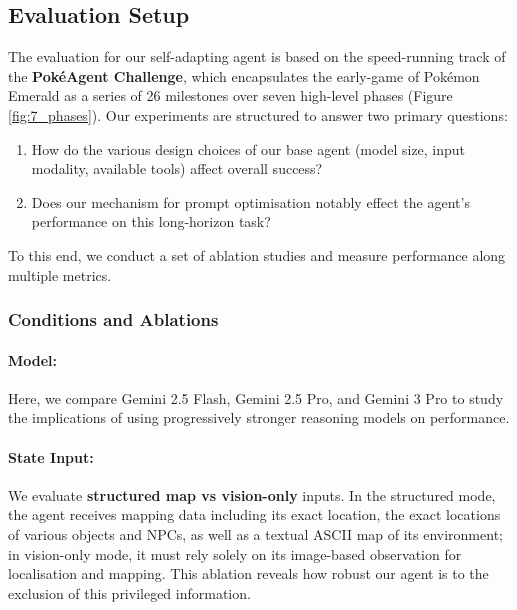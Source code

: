 \documentclass[11pt]{article}
\begin{document}
\subsection{Evaluation Setup}
The evaluation for our self-adapting agent is based on the speed-running track of the \textbf{PokéAgent Challenge}, which encapsulates the early-game of Pokémon Emerald as a series of 26 milestones over seven high-level phases (Figure \ref{fig:7_phases}). Our experiments are structured to answer two primary questions:
\begin{enumerate}
    \item How do the various design choices of our base agent (model size, input modality, available tools) affect overall success? 
    \item Does our mechanism for prompt optimisation notably effect the agent’s performance on this long-horizon task?
\end{enumerate}
To this end, we conduct a set of ablation studies and measure performance along multiple metrics.

\subsubsection{Conditions and Ablations} 

\paragraph{Model:} Here, we compare Gemini 2.5 Flash, Gemini 2.5 Pro, and Gemini 3 Pro to study the implications of using progressively stronger reasoning models on performance. 

\paragraph{State Input:} We evaluate \textbf{structured map vs vision-only} inputs. In the structured mode, the agent receives mapping data including its exact location, the exact locations of various objects and NPCs, as well as a textual ASCII map of its environment; in vision-only mode, it must rely solely on its image-based observation for localisation and mapping. This ablation reveals how robust our agent is to the exclusion of this privileged information. 
\end{document}
